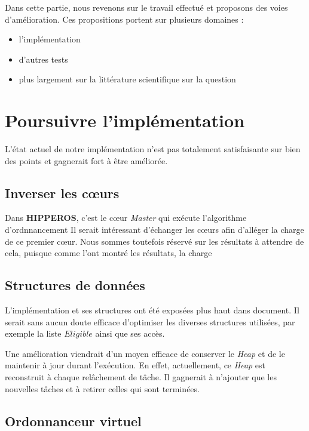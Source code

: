 \label{perspectives}
Dans cette partie, nous revenons sur le travail effectué et proposons des voies d'amélioration.
Ces propositions portent sur plusieurs domaines :
\begin{itemize}
	\item l'implémentation
	\item d'autres tests
	\item plus largement sur la littérature scientifique sur la question
\end{itemize}

\section{Poursuivre l'implémentation}

	L'état actuel de notre implémentation n'est pas totalement satisfaisante sur bien des points et 
	gagnerait fort à être améliorée. 
	
	\subsection{Inverser les cœurs}
		Dans \textbf{HIPPEROS}, c'est le cœur \textit{Master} qui exécute l'algorithme d'ordnnancement 
		Il serait intéressant d'échanger les cœurs afin d'alléger la charge de ce premier cœur. 
		Nous sommes toutefois réservé sur les résultats à attendre de cela, 
		puisque comme l'ont montré les résultats, la charge 
	
	\subsection{Structures de données}
		L'implémentation et ses structures ont été exposées plus haut dans document. 
		Il serait sans aucun doute efficace d'optimiser les diverses structures utilisées, par exemple 
		la liste $Eligible$ ainsi que ses accès. \newline
		
		Une amélioration viendrait d'un moyen efficace de conserver le \textit{Heap} et de le maintenir 
		à jour durant l'exécution. En effet, actuellement, ce \textit{Heap} est reconstruit à chaque 
		relâchement de tâche. Il gagnerait à n'ajouter que les nouvelles tâches et à retirer celles qui sont terminées.

	\subsection{Ordonnanceur virtuel}
	

